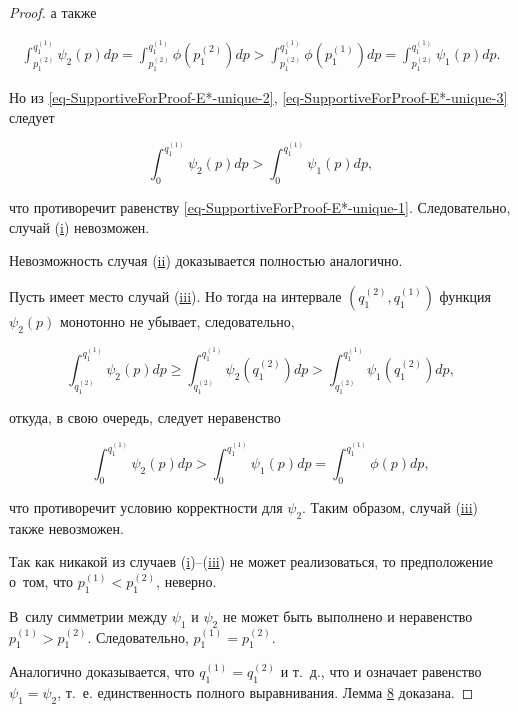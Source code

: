 \begin{proof}
а также

\begin{gather}

\int _{p_1^{(2)}}^{q_1^{(1)}}\psi_2(p)dp=\int _{p_1^{(2)}}^{q_1^{(1)}}\phi(p_1^{(2)})dp>\int _{p_1^{(2)}}^{q_1^{(1)}}\phi(p_1^{(1)})dp=\int _{p_1^{(2)}}^{q_1^{(1)}}\psi_1(p)dp.\label{eq-SupportiveForProof-E*-unique-3}

\end{gather}

Но из \eqref{eq-SupportiveForProof-E*-unique-2}, \eqref{eq-SupportiveForProof-E*-unique-3} следует 

$$

\int _0^{q_1^{(1)}}\psi_2(p)dp>\int _0^{q_1^{(1)}}\psi_1(p)dp,

$$

что противоречит равенству \eqref{eq-SupportiveForProof-E*-unique-1}. Следовательно, случай (\hyperlink{8i}{i}) невозможен.





Невозможность случая (\hyperlink{8ii}{ii}) доказывается полностью аналогично.



Пусть имеет место случай (\hyperlink{8iii}{iii}). Но тогда на интервале $(q_1^{(2)},q_1^{(1)})$ функция $\psi_2(p)$ монотонно не убывает, следовательно,

$$

\int _{q_1^{(2)}}^{q_1^{(1)}}\psi_2(p)dp\ge\int _{q_1^{(2)}}^{q_1^{(1)}}\psi_2(q_1^{(2)})dp>\int _{q_1^{(2)}}^{q_1^{(1)}}\psi_1(q_1^{(2)})dp,

$$

откуда, в свою очередь, следует неравенство

$$

\int _0^{q_1^{(1)}}\psi_2(p)dp>\int _0^{q_1^{(1)}}\psi_1(p)dp=\int _0^{q_1^{(1)}}\phi(p)dp,

$$

что противоречит условию корректности для $\psi_2$. Таким образом, случай (\hyperlink{8iii}{iii}) также невозможен.





Так как никакой из случаев (\hyperlink{8i}{i})--(\hyperlink{8iii}{iii}) не может реализоваться, то предположение о~том, что $p_1^{(1)}<p_1^{(2)}$, неверно. 

В~силу симметрии между $\psi_1$ и $\psi_2$ не может быть выполнено и неравенство $p_1^{(1)}>p_1^{(2)}$. Следовательно, $p_1^{(1)}=p_1^{(2)}$. 



Аналогично доказывается, что $q_1^{(1)}=q_1^{(2)}$ и т.~д., что и означает равенство $\psi_1=\psi_2$, т.~е. единственность полного выравнивания. Лемма \hyperlink{palin:lemma8}{8} доказана. \hfill\end{proof}



